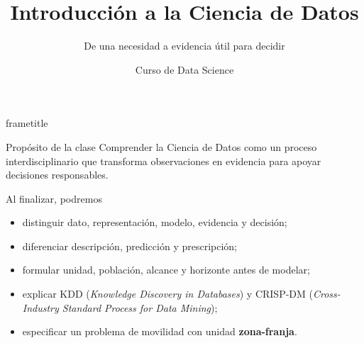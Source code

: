 \documentclass[aspectratio=169,11pt]{beamer}
\title[Data Science · Clase 1]{Introducción a la Ciencia de Datos}
\subtitle{De una necesidad a evidencia útil para decidir}
\author{Curso de Data Science}
\institute{Semana 1 · Clase 1}
\date{}
\begin{document}
\begin{frame}[plain]
  \begin{beamercolorbox}[wd=\paperwidth,ht=\paperheight,sep=2em]{frametitle}
    \vfill
    {\Huge\inserttitle\par}
    \vspace{0.5em}
    {\Large\insertsubtitle\par}
    \vspace{2em}
    {\color{white}\large\insertauthor\par}
    {\color{white}\insertinstitute\par}
    \vfill
  \end{beamercolorbox}
\end{frame}

\begin{frame}{Propósito de la clase}
  Comprender la Ciencia de Datos como un proceso interdisciplinario que transforma observaciones en evidencia para apoyar decisiones responsables.
  \vspace{0.5em}
  \begin{block}{Al finalizar, podremos}
    \begin{itemize}
      \item distinguir dato, representación, modelo, evidencia y decisión;
      \item diferenciar descripción, predicción y prescripción;
      \item formular unidad, población, alcance y horizonte antes de modelar;
      \item explicar KDD (\textit{Knowledge Discovery in Databases}) y CRISP-DM (\textit{Cross-Industry Standard Process for Data Mining});
      \item especificar un problema de movilidad con unidad \textbf{zona-franja}.
    \end{itemize}
  \end{block}
\end{frame}
\end{document}
